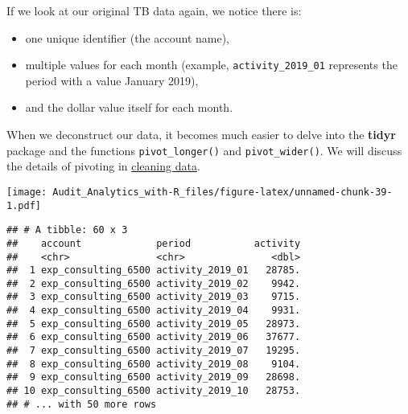 \documentclass[
]{book}
\newenvironment{Shaded}{\begin{snugshade}}{\end{snugshade}}
\newcommand{\CommentTok}[1]{\textcolor[rgb]{0.56,0.35,0.01}{\textit{#1}}}
\newcommand{\DataTypeTok}[1]{\textcolor[rgb]{0.13,0.29,0.53}{#1}}
\newcommand{\KeywordTok}[1]{\textcolor[rgb]{0.13,0.29,0.53}{\textbf{#1}}}
\newcommand{\NormalTok}[1]{#1}
\newcommand{\OperatorTok}[1]{\textcolor[rgb]{0.81,0.36,0.00}{\textbf{#1}}}
\newcommand{\OtherTok}[1]{\textcolor[rgb]{0.56,0.35,0.01}{#1}}
\newcommand{\StringTok}[1]{\textcolor[rgb]{0.31,0.60,0.02}{#1}}
\providecommand{\tightlist}{%
  \setlength{\itemsep}{0pt}\setlength{\parskip}{0pt}}
\begin{document}
If we look at our original TB data again, we notice there is:

\begin{itemize}
\tightlist
\item
  one unique identifier (the account name),
\item
  multiple values for each month (example, \texttt{activity\_2019\_01} represents the period with a value January 2019),
\item
  and the dollar value itself for each month.
\end{itemize}

When we deconstruct our data, it becomes much easier to delve into the \textbf{tidyr} package and the functions \texttt{pivot\_longer()} and \texttt{pivot\_wider()}. We will discuss the details of pivoting in \protect\hyperlink{clean-pivot}{cleaning data}.

\begin{Shaded}
\end{Shaded}

\texttt{[image: Audit\_Analytics\_with-R\_files/figure-latex/unnamed-chunk-39-1.pdf]}

\begin{Shaded}
\end{Shaded}

\begin{verbatim}
## # A tibble: 60 x 3
##    account             period           activity
##    <chr>               <chr>               <dbl>
##  1 exp_consulting_6500 activity_2019_01   28785.
##  2 exp_consulting_6500 activity_2019_02    9942.
##  3 exp_consulting_6500 activity_2019_03    9715.
##  4 exp_consulting_6500 activity_2019_04    9931.
##  5 exp_consulting_6500 activity_2019_05   28973.
##  6 exp_consulting_6500 activity_2019_06   37677.
##  7 exp_consulting_6500 activity_2019_07   19295.
##  8 exp_consulting_6500 activity_2019_08    9104.
##  9 exp_consulting_6500 activity_2019_09   28698.
## 10 exp_consulting_6500 activity_2019_10   28753.
## # ... with 50 more rows
\end{verbatim}
\end{document}

